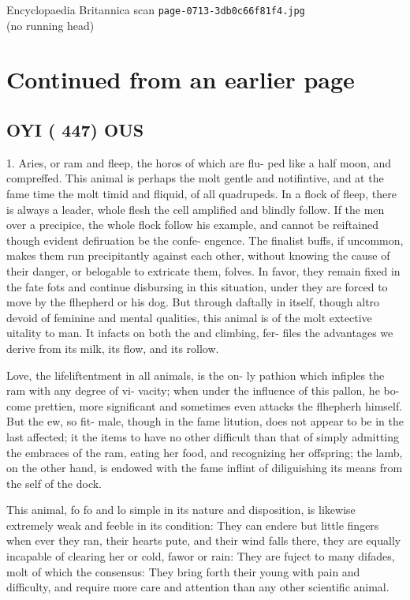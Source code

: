 \documentclass{article}
\begin{document}
\begin{center}
{\Large Encyclopaedia Britannica scan \texttt{page-0713-3db0c66f81f4.jpg}}\\[0.5em]
(no running head)
\end{center}
\section*{Continued from an earlier page}
\subsection*{OYI ( 447) OUS}
1. Aries, or ram and fleep, the horos of which are flu- ped like a half moon, and compreffed. This animal is perhaps the molt gentle and notifintive, and at the fame time the molt timid and fliquid, of all quadrupeds. In a flock of fleep, there is always a leader, whole flesh the cell amplified and blindly follow. If the men over a precipice, the whole flock follow his example, and cannot be reiftained though evident defiruation be the confe- engence. The finalist buffs, if uncommon, makes them run precipitantly against each other, without knowing the cause of their danger, or belogable to extricate them, folves. In favor, they remain fixed in the fate fots and continue disbursing in this situation, under they are forced to move by the flhepherd or his dog. But through daftally in itself, though altro devoid of feminine and mental qualities, this animal is of the molt extective uitality to man. It infacts on both the and climbing, fer- files the advantages we derive from its milk, its flow, and its rollow.

Love, the lifeliftentment in all animals, is the on- ly pathion which infiples the ram with any degree of vi- vacity; when under the influence of this pallon, he bo- come prettien, more significant and sometimes even attacks the flhepherh himself. But the ew, so fit- male, though in the fame litution, does not appear to be in the last affected; it the items to have no other difficult than that of simply admitting the embraces of the ram, eating her food, and recognizing her offspring; the lamb, on the other hand, is endowed with the fame inflint of diliguishing its means from the self of the dock.

This animal, fo fo and lo simple in its nature and disposition, is likewise extremely weak and feeble in its condition: They can endere but little fingers when ever they ran, their hearts pute, and their wind falls there, they are equally incapable of clearing her or cold, fawor or rain: They are fuject to many difades, molt of which the consensus: They bring forth their young with pain and difficulty, and require more care and attention than any other scientific animal.
\end{document}
